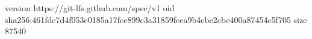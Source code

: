 version https://git-lfs.github.com/spec/v1
oid sha256:461fde7d4f053e0185a17fce899c3a31859feea9b4ebc2ebe400a87454c5f705
size 87540
